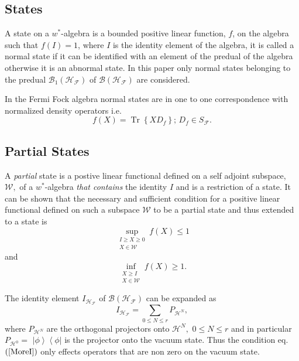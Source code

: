 \documentclass[aps,preprint]{revtex4}%
\begin{document}
\subsection{States \label{States}}

A state on a $w^{\ast}$-algebra is a bounded positive linear function, $f$, on
the algebra such that $f\left(  I\right)  =1$, where $I$ is the identity
element of the algebra, it is called a normal state if it can be identified
with an element of the predual of the algebra otherwise it is an abnormal
state. In this paper only normal states belonging to the predual
$\mathcal{B}_{1}\left(  \mathcal{H}_{\mathcal{F}}\right)  $ of $\mathcal{B}%
\left(  \mathcal{H}_{\mathcal{F}}\right)  $ are considered.

In the Fermi Fock algebra normal states are in one to one correspondence with
normalized density operators i.e.
\begin{equation}
f\left(  X\right)  =\operatorname*{Tr}\left\{  XD_{f}\right\}  ;\,D_{f}\in
S_{\mathcal{F}}.
\end{equation}


\subsection{Partial States \label{Partial States}}

A \emph{partial} state is a postive linear functional defined on a self
adjoint subspace, $\mathcal{W},$ of a $w^{\ast}$-algebra \emph{that contains}
the identity $I$ and is a restriction of a state. It can be shown \cite{Emch,
Krein} that the necessary and sufficient condition for a positive linear
functional defined on such a subspace $\mathcal{W}$ to be a partial state and
thus extended to a state is
\begin{equation}
\sup_{\substack{I\geq X\geq0\\X\in\mathcal{W}}}f\left(  X\right)  \leq1
\label{LessI}%
\end{equation}
and%
\begin{equation}
\inf_{\substack{X\geq I\\X\in\mathcal{W}}}f\left(  X\right)  \geq1.
\label{MoreI}%
\end{equation}


The identity element $I_{\mathcal{H}_{\mathcal{F}}}$ of $\mathcal{B}\left(
\mathcal{H}_{\mathcal{F}}\right)  $ can be expanded as
\begin{equation}
I_{\mathcal{H}_{\mathcal{F}}}=\sum_{0\leq N\leq r}P_{\mathcal{H}^{N}},
\end{equation}
where $P_{\mathcal{H}^{N}}$ are the orthogonal projectors onto $\mathcal{H}%
^{N},$ $0\leq N\leq r$ and in particular $P_{\mathcal{H}^{0}}=$ $\left\vert
\phi\right\rangle \left\langle \phi\right\vert $ is the projector onto the
vacuum state. Thus the condition eq.$\left(  \ref{MoreI}\right)  $ only
effects operators that are non zero on the vacuum state.
\end{document}
